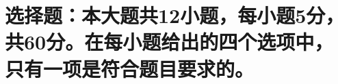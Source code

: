 \documentclass[17pt,twoside,space]{ctexart}
\begin{document}



\section{选择题：本大题共12小题，每小题5分，共60分。在每小题给出的四个选项中，只有一项是符合题目要求的。}
\end{document}
